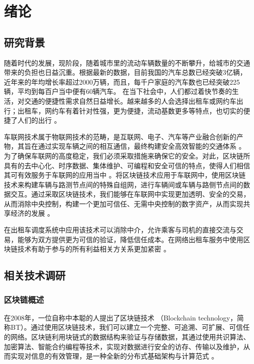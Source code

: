 
\chapter{绪论}

\section{研究背景}

随着时代的发展，现阶段，随着城市里的流动车辆数量的不断攀升，给城市的交通带来的负担也日益沉重。根据最新的数据，目前我国的汽车总数已经突破3亿辆，近年来的年均增长率超过2000万辆，而且，每千户家庭的汽车数也已经突破225辆，平均到每百户当中便有60辆汽车。 在当下社会中，人们都过着快节奏的生活，对交通的便捷性需求自然日益增长。越来越多的人会选择出租车或网约车出行；出租车，网约车有着针对性强，更为便捷，流动基数更多等特点，也切实的便捷了人们的出行 。

车联网技术属于物联网技术的范畴，是互联网、电子、汽车等产业融合创新的产物，其旨在通过实现车辆之间的相互通信，最终构建安全高效智能的交通体系 。为了确保车联网的高度稳定，我们必须采取措施来确保它的安全。对此，区块链所具有的去中心化、时序数据、集体维护、可编程和安全可信的特点，使得人们相信其可有效服务于车联网的应用当中 。将区块链技术应用于车联网中，使用区块链技术来构建车辆与路测节点间的特殊自组网，进行车辆间或车辆与路侧节点间的数据交互。通过采取区块链技术，我们能够在车联网中实现更加透明、安全的交易，从而消除中央控制，构建一个更加可信任、无需中央控制的数字资产，从而实现共享经济的发展 。

在出租车调度系统中应用该技术可以消除中介，允许乘客与司机的直接交流与交易，能够为双方提供更为可信的验证，降低信任成本。在网络出租车服务中使用区块链技术有助于参与的所有利益相关方关系更加紧密 。

\section{相关技术调研}

\subsection{区块链概述}

在2008年，一位自称中本聪的人提出了区块链技术 （Blockchain technology，简称BT）。通过使用区块链技术，我们可以建立一个完整、可追溯、可扩展、可信任的网络。区块链利用块链式的数据结构来验证与存储数据，其通过使用共识算法、加密算法、智能合约编程等技术，实现对数据进行安全的访存、传输以及维护，从而实现对信息的有效管理，是一种全新的分布式基础架构与计算范式 。

